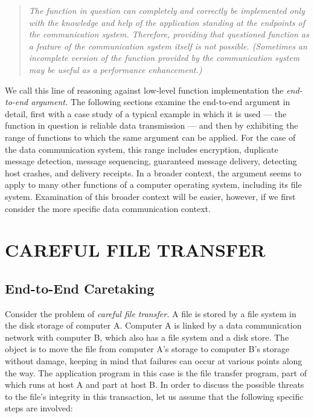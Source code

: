 \documentclass[a4paper,11pt,notitlepage,twoside,openright]{article}
\begin{document}
\begin{quote}
\it
The function in question can completely and correctly be
implemented only with the knowledge and help of the application standing
at the endpoints of the communication system. Therefore, providing that
questioned function as a feature of the communication system itself is
not possible. (Sometimes an incomplete version of the function provided
by the communication system may be useful as a performance
enhancement.)
\end{quote}

We call this line of reasoning against low-level function implementation
the \emph{end-to-end argument.} The following sections examine the
end-to-end argument in detail, first with a case study of a typical
example in which it is used --- the function in question is reliable
data transmission --- and then by exhibiting the range of functions to
which the same argument can be applied. For the case of the data
communication system, this range includes encryption, duplicate message
detection, message sequencing, guaranteed message delivery, detecting
host crashes, and delivery receipts. In a broader context, the argument
seems to apply to many other functions of a computer operating system,
including its file system. Examination of this broader context will be
easier, however, if we first consider the more specific data
communication context.

\hypertarget{careful-file-transfer}{%
\section{CAREFUL FILE TRANSFER}\label{careful-file-transfer}}

\hypertarget{end-to-end-caretaking}{%
\subsection{End-to-End Caretaking}\label{end-to-end-caretaking}}


Consider the problem of \emph{careful file transfer.} A file is stored
by a file system in the disk storage of computer A. Computer A is linked
by a data communication network with computer B, which also has a file
system and a disk store. The object is to move the file from computer
A's storage to computer B's storage without damage, keeping in mind that
failures can occur at various points along the way. The application
program in this case is the file transfer program, part of which runs at
host A and part at host B. In order to discuss the possible threats to
the file's integrity in this transaction, let us assume that the
following specific steps are involved:
\end{document}
